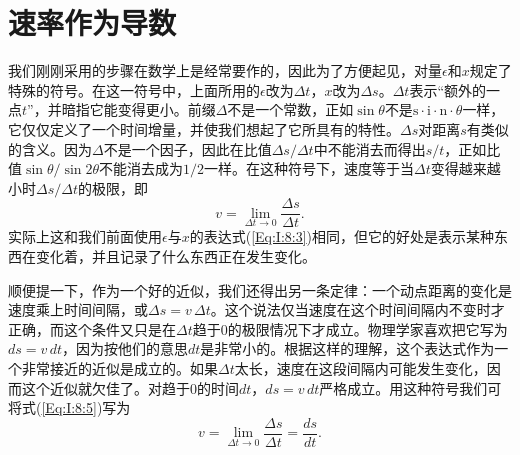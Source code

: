 \section{速率作为导数}
我们刚刚采用的步骤在数学上是经常要作的，因此为了方便起见，对量$\epsilon$和$x$规定了特殊的符号。在这一符号中，上面所用的$\epsilon$改为$\Delta t$，$x$改为$\Delta s$。$\Delta t$表示“额外的一点$t$”，并暗指它能变得更小。前缀$\Delta$不是一个常数，正如$\sin \theta$不是$\text{s}\cdot\text{i}\cdot\text{n}\cdot\theta$一样，它仅仅定义了一个时间增量，并使我们想起了它所具有的特性。$\Delta s$对距离$s$有类似的含义。因为$\Delta$不是一个因子，因此在比值$\Delta s/\Delta t$中不能消去而得出$s/t$，正如比值$\sin\theta/\sin2\theta$不能消去成为$1/2$一样。在这种符号下，速度等于当$\Delta t$变得越来越小时$\Delta s/\Delta t$的极限，即
\begin{equation}
\label{Eq:I:8:5}
v=\lim_{\Delta t\to0}\frac{\Delta s}{\Delta t}.
\end{equation}
实际上这和我们前面使用$\epsilon$与$x$的表达式(\ref{Eq:I:8:3})相同，但它的好处是表示某种东西在变化着，并且记录了什么东西正在发生变化。

顺便提一下，作为一个好的近似，我们还得出另一条定律：一个动点距离的变化是速度乘上时间间隔，或$\Delta s=v\,\Delta t$。这个说法仅当速度在这个时间间隔内不变时才正确，而这个条件又只是在$\Delta t$趋于0的极限情况下才成立。物理学家喜欢把它写为$ds=v\,dt$，因为按他们的意思$dt$是非常小的。根据这样的理解，这个表达式作为一个非常接近的近似是成立的。如果$\Delta t$太长，速度在这段间隔内可能发生变化，因而这个近似就欠佳了。对趋于0的时间$dt$，$ds=v\,dt$严格成立。用这种符号我们可将式(\ref{Eq:I:8:5})写为
\begin{equation*}
v=\lim_{\Delta t\to0}\frac{\Delta s}{\Delta t}=\frac{ds}{dt}.
\end{equation*}

